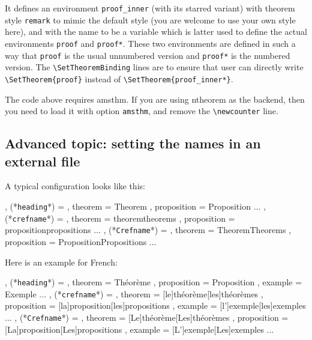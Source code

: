 \documentclass[classical]{einfart}
\newcommand{\packageoption}[1]{\textcolor{code-option}{\texttt{#1}}}
\newcommand{\commandoption}[1]{\textcolor{code-keys}{\texttt{#1}}}
\newenvironment{tip}[1][Tip]
  {%
    \LocallyStopLineNumbers%
    \begin{tcolorbox}[breakable,
        enhanced,
        width = \textwidth,
        colback = paper, colbacktitle = paper,
        colframe = gray!50, boxrule=0.2mm,
        coltitle = black,
        fonttitle = \sffamily,
        attach boxed title to top left = {yshift=-\tcboxedtitleheight/2, xshift=.5cm},
        boxed title style = {boxrule=0pt, colframe=paper},
        before skip = 3mm,
        after skip = 3mm,
        top = 2.5mm,
        bottom = 1.5mm,
        title={\scshape\sffamily #1}]%
  }
  {%
    \end{tcolorbox}%
    \ResumeLineNumbers%
  }
\begin{document}
It defines an environment \lstinline|proof_inner| (with its starred variant) with theorem style \lstinline|remark| to mimic the default style (you are welcome to use your own style here), and with the name to be a variable which is latter used to define the actual environments \lstinline|proof| and \lstinline|proof*|. These two environments are defined in such a way that \lstinline|proof| is the usual unnumbered version and \lstinline|proof*| is the numbered version. The \lstinline|\SetTheoremBinding| lines are to ensure that user can directly write \lstinline|\SetTheorem{proof}| instead of \lstinline|\SetTheorem{proof_inner*}|.

\begin{tip}[Attention]
    The code above requires \textsf{amsthm}. If you are using \textsf{ntheorem} as the backend, then you need to load it with option \packageoption{amsthm}, and remove the \lstinline|\newcounter| line.
\end{tip}

\medskip
\subsection{Advanced topic: setting the names in an external file}

A typical configuration looks like this:

\begin{code}
  {
    , (*\commandoption{heading}*) =   {
                    , theorem        = Theorem
                    , proposition    = Proposition
                    ...
                  }
    , (*\commandoption{crefname}*) =  {
                    , theorem        = {theorem}{theorems}
                    , proposition    = {proposition}{propositions}
                    ...
                  }
    , (*\commandoption{Crefname}*) =  {
                    , theorem        = {Theorem}{Theorems}
                    , proposition    = {Proposition}{Propositions}
                    ...
                  }
  }
\end{code}

Here is an example for French:

\begin{code}
  {
    , (*\commandoption{heading}*) =   {
                    , theorem        = Théorème
                    , proposition    = Proposition
                    , example        = Exemple
                    ...
                  }
    , (*\commandoption{crefname}*) =  {
                    , theorem        = [le]{théorème}[les]{théorèmes}
                    , proposition    = [la]{proposition}[les]{propositions}
                    , example        = [l']{exemple}[les]{exemples}
                    ...
                  }
    , (*\commandoption{Crefname}*) =  {
                    , theorem        = [Le]{théorème}[Les]{théorèmes}
                    , proposition    = [La]{proposition}[Les]{propositions}
                    , example        = [L']{exemple}[Les]{exemples}
                    ...
                  }
  }
\end{code}
\end{document}
